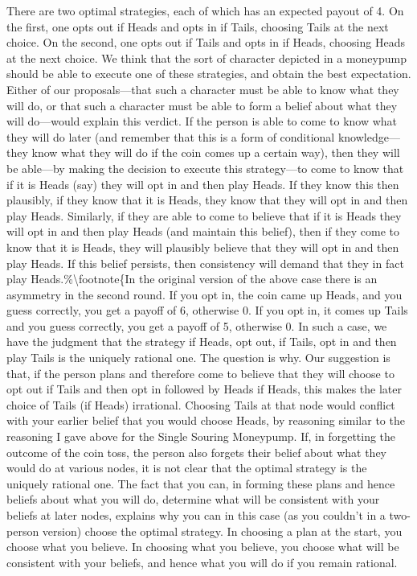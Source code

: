 \documentclass[
  11pt,
  letterpaper,
  DIV=11,
  numbers=noendperiod,
  twoside]{scrartcl}
\begin{document}
There are two optimal strategies, each of which has an expected payout
of 4. On the first, one opts out if Heads and opts in if Tails, choosing
Tails at the next choice. On the second, one opts out if Tails and opts
in if Heads, choosing Heads at the next choice. We think that the sort
of character depicted in a moneypump should be able to execute one of
these strategies, and obtain the best expectation. Either of our
proposals---that such a character must be able to know what they will
do, or that such a character must be able to form a belief about what
they will do---would explain this verdict. If the person is able to come
to know what they will do later (and remember that this is a form of
conditional knowledge---they know what they will do if the coin comes up
a certain way), then they will be able---by making the decision to
execute this strategy---to come to know that if it is Heads (say) they
will opt in and then play Heads. If they know this then plausibly, if
they know that it is Heads, they know that they will opt in and then
play Heads. Similarly, if they are able to come to believe that if it is
Heads they will opt in and then play Heads (and maintain this belief),
then if they come to know that it is Heads, they will plausibly believe
that they will opt in and then play Heads. If this belief persists, then
consistency will demand that they in fact play
Heads.\%\textbackslash footnote\{In the original version of the above
case there is an asymmetry in the second round. If you opt in, the coin
came up Heads, and you guess correctly, you get a payoff of 6, otherwise
0. If you opt in, it comes up Tails and you guess correctly, you get a
payoff of 5, otherwise 0. In such a case, we have the judgment that the
strategy if Heads, opt out, if Tails, opt in and then play Tails is the
uniquely rational one. The question is why. Our suggestion is that, if
the person plans and therefore come to believe that they will choose to
opt out if Tails and then opt in followed by Heads if Heads, this makes
the later choice of Tails (if Heads) irrational. Choosing Tails at that
node would conflict with your earlier belief that you would choose
Heads, by reasoning similar to the reasoning I gave above for the Single
Souring Moneypump. If, in forgetting the outcome of the coin toss, the
person also forgets their belief about what they would do at various
nodes, it is not clear that the optimal strategy is the uniquely
rational one. The fact that you can, in forming these plans and hence
beliefs about what you will do, determine what will be consistent with
your beliefs at later nodes, explains why you can in this case (as you
couldn't in a two-person version) choose the optimal strategy. In
choosing a plan at the start, you choose what you believe. In choosing
what you believe, you choose what will be consistent with your beliefs,
and hence what you will do if you remain rational.
\end{document}
